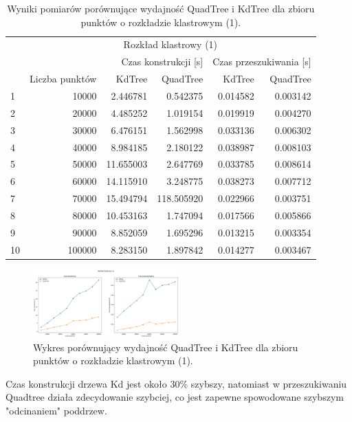 \documentclass{lab}
\begin{document}
\begin{table}[H]
\centering
\begin{tabular}{lrrrrr}
  \toprule
   & \multicolumn{5}{c}{Rozkład klastrowy (1)} \\
   &  & \multicolumn{2}{r}{Czas konstrukcji [s]} & \multicolumn{2}{r}{Czas przeszukiwania [s]} \\
   & Liczba punktów & KdTree & QuadTree & KdTree & QuadTree \\
  \midrule
  1 & 10000 & 2.446781 & 0.542375 & 0.014582 & 0.003142 \\
  2 & 20000 & 4.485252 & 1.019154 & 0.019919 & 0.004270 \\
  3 & 30000 & 6.476151 & 1.562998 & 0.033136 & 0.006302 \\
  4 & 40000 & 8.984185 & 2.180122 & 0.038987 & 0.008103 \\
  5 & 50000 & 11.655003 & 2.647769 & 0.033785 & 0.008614 \\
  6 & 60000 & 14.115910 & 3.248775 & 0.038273 & 0.007712 \\
  7 & 70000 & 15.494794 & 118.505920 & 0.022966 & 0.003751 \\
  8 & 80000 & 10.453163 & 1.747094 & 0.017566 & 0.005866 \\
  9 & 90000 & 8.852059 & 1.695296 & 0.013215 & 0.003354 \\
  10 & 100000 & 8.283150 & 1.897842 & 0.014277 & 0.003467 \\
  \bottomrule
  \end{tabular}
\caption{Wyniki pomiarów porównujące wydajność QuadTree i KdTree dla zbioru punktów o rozkładzie klastrowym (1).}
\label{tab:cluster_time_1}
\end{table}

\begin{figure}[H]
  \centering
  \includegraphics[width=0.5\textwidth]{resources/cluster_graph_1.png}
  \caption{Wykres porównujący wydajność QuadTree i KdTree dla zbioru punktów o rozkładzie klastrowym (1).}
  \label{fig:cluster_graph_1}
\end{figure}

Czas konstrukcji drzewa Kd jest około 30\% szybszy, natomiast w przeszukiwaniu Quadtree działa zdecydowanie szybciej, co jest zapewne spowodowane szybszym "odcinaniem" poddrzew.
\end{document}
